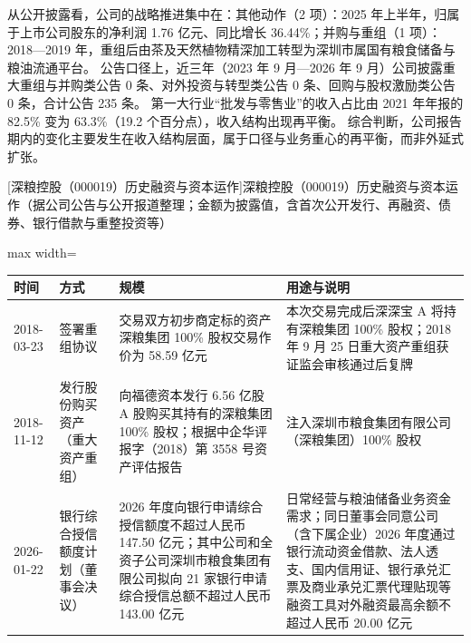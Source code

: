  从公开披露看，公司的战略推进集中在：其他动作（2 项）：2025 年上半年，归属于上市公司股东的净利润 1.76 亿元、同比增长 36.44\%；并购与重组（1 项）：2018---2019 年，重组后由茶及天然植物精深加工转型为深圳市属国有粮食储备与粮油流通平台。 公告口径上，近三年（2023 年 9 月---2026 年 9 月）公司披露重大重组与并购类公告 0 条、对外投资与转型类公告 0 条、回购与股权激励类公告 0 条，合计公告 235 条。 第一大行业“批发与零售业”的收入占比由 2021 年年报的 82.5\% 变为 63.3\%（19.2 个百分点），收入结构出现再平衡。 综合判断，公司报告期内的变化主要发生在收入结构层面，属于口径与业务重心的再平衡，而非外延式扩张。

\begin{center}\small\setlength{\tabcolsep}{4pt}
[深粮控股（000019）历史融资与资本运作]{深粮控股（000019）历史融资与资本运作（据公司公告与公开报道整理；金额为披露值，含首次公开发行、再融资、债券、银行借款与重整投资等）}
\begin{adjustbox}{max width=\textwidth}
\begin{tabular}{@{}p{1.45cm}p{2.55cm}p{4.05cm}p{4.95cm}@{}}
\toprule
时间 & 方式 & 规模 & 用途与说明 \\
\midrule
2018-03-23 & 签署重组协议 & 交易双方初步商定标的资产深粮集团 100\% 股权交易作价为 58.59 亿元 & 本次交易完成后深深宝 A 将持有深粮集团 100\% 股权；2018 年 9 月 25 日重大资产重组获证监会审核通过后复牌 \\
2018-11-12 & 发行股份购买资产（重大资产重组） & 向福德资本发行 6.56 亿股 A 股购买其持有的深粮集团 100\% 股权；根据中企华评报字（2018）第 3558 号资产评估报告 & 注入深圳市粮食集团有限公司（深粮集团）100\% 股权 \\
2026-01-22 & 银行综合授信额度计划（董事会决议） & 2026 年度向银行申请综合授信额度不超过人民币 147.50 亿元；其中公司和全资子公司深圳市粮食集团有限公司拟向 21 家银行申请综合授信总额不超过人民币 143.00 亿元 & 日常经营与粮油储备业务资金需求；同日董事会同意公司（含下属企业）2026 年度通过银行流动资金借款、\allowbreak{}法人透支、\allowbreak{}国内信用证、\allowbreak{}银行承兑汇票及商业承兑汇票代理贴现等融资工具对外融资最高余额不超过人民币 20.00 亿元 \\
\bottomrule
\end{tabular}
\end{adjustbox}
\end{center}

